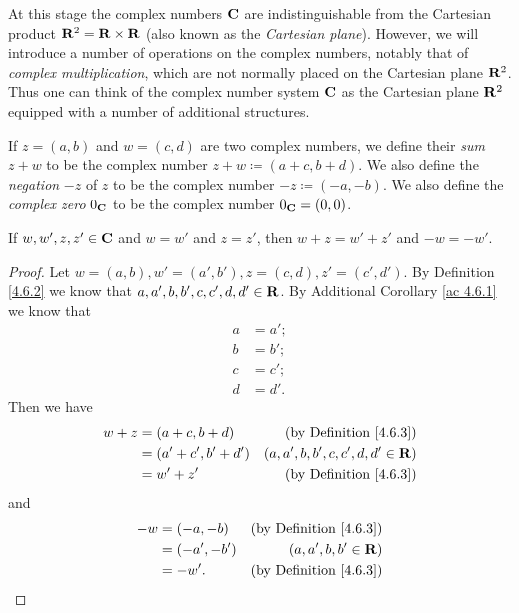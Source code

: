 \begin{note}
    At this stage the complex numbers \(\mathbf{C}\) are indistinguishable from the Cartesian product \(\mathbf{R}^2 = \mathbf{R} \times \mathbf{R}\)
    (also known as the \emph{Cartesian plane}).
    However, we will introduce a number of operations on the complex numbers, notably that of \emph{complex multiplication}, which are not normally placed on the Cartesian plane \(\mathbf{R}^2\).
    Thus one can think of the complex number system \(\mathbf{C}\) as the Cartesian plane \(\mathbf{R}^2\) equipped with a number of additional structures.
\end{note}

\begin{definition}\label{4.6.3}
    If \(z = (a, b)\) and \(w = (c, d)\) are two complex numbers, we define their \emph{sum} \(z + w\) to be the complex number \(z + w \coloneqq (a + c, b + d)\).
    We also define the \emph{negation} \(-z\) of \(z\) to be the complex number \(-z \coloneqq (-a, -b)\).
    We also define the \emph{complex zero} \(0_{\mathbf{C}}\) to be the complex number \(0_{\mathbf{C}} = (0, 0)\).
\end{definition}

\begin{additional corollary}\label{ac 4.6.2}
If \(w, w', z, z' \in \mathbf{C}\) and \(w = w'\) and \(z = z'\), then \(w + z = w' + z'\) and \(-w = -w'\).
\end{additional corollary}

\begin{proof}
    Let \(w = (a, b), w' = (a', b'), z = (c, d), z' = (c', d')\).
    By Definition \ref{4.6.2} we know that \(a, a', b, b', c, c', d, d' \in \mathbf{R}\).
    By Additional Corollary \ref{ac 4.6.1} we know that
    \begin{align*}
        a & = a'; \\
        b & = b'; \\
        c & = c'; \\
        d & = d'.
    \end{align*}
    Then we have
    \begin{align*}
        w + z & = (a + c, b + d)     & \text{(by Definition \ref{4.6.3})}  \\
              & = (a' + c', b' + d') & (a, a', b, b', c, c', d, d' \in \mathbf{R}) \\
              & = w' + z'            & \text{(by Definition \ref{4.6.3})}
    \end{align*}
    and
    \begin{align*}
        -w & = (-a, -b)   & \text{(by Definition \ref{4.6.3})} \\
           & = (-a', -b') & (a, a', b, b' \in \mathbf{R})              \\
           & = -w'.       & \text{(by Definition \ref{4.6.3})}
    \end{align*}
\end{proof}

